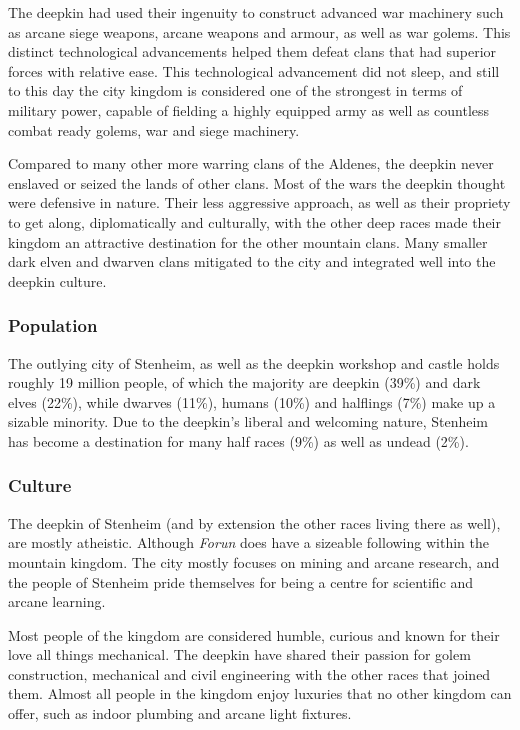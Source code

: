 The deepkin had used their ingenuity to construct advanced war machinery such
as arcane siege weapons, arcane weapons and armour, as well as war
golems. This distinct technological advancements helped them defeat clans that
had superior forces with relative ease. This technological advancement did not
sleep, and still to this day the city kingdom is considered one of the
strongest in terms of military power, capable of fielding a highly equipped
army as well as countless combat ready golems, war and siege machinery.

Compared to many other more warring clans of the Aldenes, the deepkin never
enslaved or seized the lands of other clans. Most of the wars the deepkin
thought were defensive in nature. Their less aggressive approach, as well as
their propriety to get along, diplomatically and culturally, with the other
deep races made their kingdom an attractive destination for the other mountain
clans. Many smaller dark elven and dwarven clans mitigated to the city and
integrated well into the deepkin culture.

\subsubsection{Population}

The outlying city of Stenheim, as well as the deepkin workshop and castle holds
roughly 19 million people, of which the majority are deepkin (39\%) and dark
elves (22\%), while dwarves (11\%), humans (10\%) and halflings (7\%) make up a
sizable minority. Due to the deepkin's liberal and welcoming nature, Stenheim
has become a destination for many half races (9\%) as well as undead (2\%).

\subsubsection{Culture}

The deepkin of Stenheim (and by extension the other races living there as
well), are mostly atheistic. Although \emph{Forun} does have a sizeable
following within the mountain kingdom. The city mostly focuses on mining and
arcane research, and the people of Stenheim pride themselves for being a
centre for scientific and arcane learning.

Most people of the kingdom are considered humble, curious and known for their
love all things mechanical. The deepkin have shared their passion for golem
construction, mechanical and civil engineering with the other races that joined
them. Almost all people in the kingdom enjoy luxuries that no other kingdom can
offer, such as indoor plumbing and arcane light fixtures.

